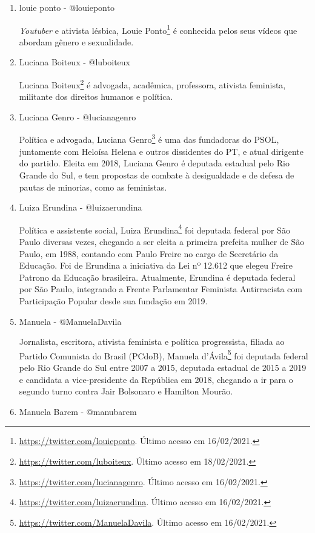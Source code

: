 \documentclass[
	12pt,				%
	openright,			%
	twoside,			%
	a4paper,			%
	english,			%
	brazil				%
	]{abntex2}
\begin{document}
\begin{anexosenv}
\begin{enumerate}
 \item louie ponto - @louieponto
 
 \textit{Youtuber} e ativista lésbica, Louie Ponto\footnote{\url{https://twitter.com/louieponto}. Último acesso em 16/02/2021.} é conhecida pelos seus vídeos que abordam gênero e sexualidade.

 \item Luciana Boiteux - @luboiteux
 
 Luciana Boiteux\footnote{\url{https://twitter.com/luboiteux}. Último acesso em 18/02/2021.} é advogada, acadêmica, professora, ativista feminista, militante dos direitos humanos e política.

 \item Luciana Genro - @lucianagenro
 
 Política e advogada, Luciana Genro\footnote{\url{https://twitter.com/lucianagenro}. Último acesso em 16/02/2021.} é uma das fundadoras do PSOL, juntamente com Heloísa Helena e outros dissidentes do PT, e atual dirigente do partido. Eleita em 2018, Luciana Genro é deputada estadual pelo Rio Grande do Sul, e tem propostas de combate à desigualdade e de defesa de pautas de minorias, como as feministas.

 \item Luiza Erundina - @luizaerundina
 
 Política e assistente social, Luiza Erundina\footnote{\url{https://twitter.com/luizaerundina}. Último acesso em 16/02/2021.} foi deputada federal por São Paulo diversas vezes, chegando a ser eleita a primeira prefeita mulher de São Paulo, em 1988, contando com Paulo Freire no cargo de Secretário da Educação. Foi de Erundina a iniciativa da Lei nº 12.612 que elegeu Freire Patrono da Educação brasileira. Atualmente, Erundina é deputada federal por São Paulo, integrando a Frente Parlamentar Feminista Antirracista com Participação Popular desde sua fundação em 2019.

 \item Manuela - @ManuelaDavila
 
 Jornalista, escritora, ativista feminista e política progressista, filiada ao Partido Comunista do Brasil (PCdoB), Manuela d'Ávila\footnote{\url{https://twitter.com/ManuelaDavila}. Último acesso em 16/02/2021.} foi deputada federal pelo Rio Grande do Sul entre 2007 a 2015, deputada estadual de 2015 a 2019 e candidata a vice-presidente da República em 2018, chegando a ir para o segundo turno contra Jair Bolsonaro e Hamilton Mourão.

 \item Manuela Barem - @manubarem
 

\end{enumerate}
\end{anexosenv}
\end{document}
